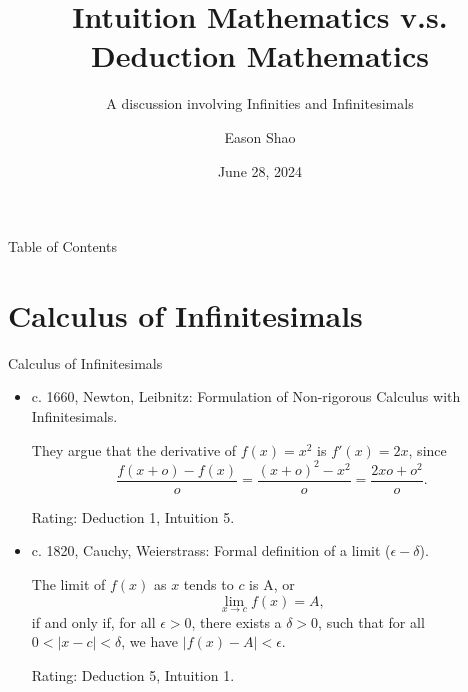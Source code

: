 \documentclass{beamer}
\title[Intuition v.s. Deduction]{Intuition Mathematics v.s. Deduction Mathematics}
\subtitle{A discussion involving Infinities and Infinitesimals}
\author{Eason Shao}
\institute{St Paul's School}
\date{June 28, 2024}
\begin{document}
\frame{\titlepage}

\begin{frame}{Table of Contents}
    \nocite{nsa}
    \nocite{tp}
    \nocite{hr}
    \nocite{ift}
    \nocite{calc}
    \nocite{hocalc}
    \tableofcontents
\end{frame}

\section{Calculus of Infinitesimals}

\begin{frame}{Calculus of Infinitesimals}
    \begin{itemize}
        \item c. 1660, Newton, Leibnitz: Formulation of Non-rigorous Calculus with Infinitesimals.\pause

              \begin{example}
                  They argue that the derivative of \(f(x) = x^2\) is \(f'(x) = 2x\), since
                  \[
                      \frac{f(x + o) - f(x)}{o} = \frac{(x + o)^2 - x^2}{o} = \frac{2 x o + o^2}{o}.
                  \]
              \end{example}\pause

              Rating: \pause Deduction 1, \pause Intuition 5.
    \end{itemize}
\end{frame}

\begin{frame}
    \begin{itemize}
        \item c. 1820, Cauchy, Weierstrass: Formal definition of a limit (\(\epsilon-\delta\)).\pause

              \begin{definition}
                  The limit of \(f(x)\) as \(x\) tends to \(c\) is A, or
                  \[
                      \lim_{x \rightarrow c} f(x) = A,
                  \]
                  if and only if, for all \(\epsilon > 0\), there exists a \(\delta > 0\), such that for all \(0 < |x - c| < \delta\), we have \(|f(x) - A| < \epsilon\).
              \end{definition}\pause

              Rating: \pause Deduction 5, \pause Intuition 1.
    \end{itemize}
\end{frame}
\end{document}
